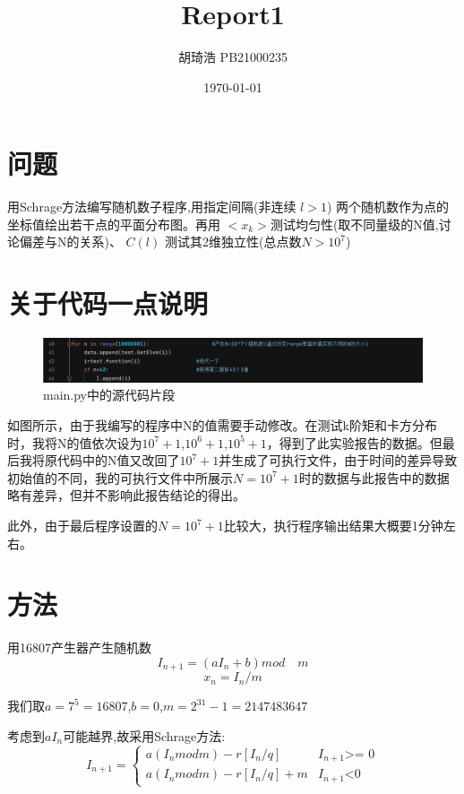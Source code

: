 \documentclass[UTF8]{ctexart}
\title{\textbf{Report1}}
\author{胡琦浩  PB21000235}
\date{\today}
\begin{document}
\maketitle

\section{问题}
用Schrage方法编写随机数子程序,用指定间隔(非连续 $l >1$)
两个随机数作为点的坐标值绘出若干点的平面分布图。再用
$<x_k>$测试均匀性(取不同量级的N值,讨论偏差与N的关系)、
$C(l)$ 测试其2维独立性(总点数$N > 10^7$)

\section{关于代码一点说明}
\begin{figure}[htbp]
    \centering
    \includegraphics[scale=0.5]{2}
    \caption{main.py中的源代码片段}
\end{figure}
如图所示，由于我编写的程序中N的值需要手动修改。在测试k阶矩和卡方分布时，我将N的值依次设为$10^7+1$,$10^6+1$,$10^5+1$，得到了此实验报告的数据。但最后我将原代码中的N值又改回了$10^7+1$并生成了可执行文件，由于时间的差异导致初始值的不同，我的可执行文件中所展示$N=10^7+1$时的数据与此报告中的数据略有差异，但并不影响此报告结论的得出。

此外，由于最后程序设置的$N=10^7+1$比较大，执行程序输出结果大概要1分钟左右。

\section{方法}
用16807产生器产生随机数
\begin{equation}
    I_{n+1}=(aI_n+b)mod \quad m
\end{equation}
\begin{equation}
    x_n=I_n/m
\end{equation}

我们取$a=7^5=16807$,\quad $b=0$,\quad$m=2^{31}-1=2147483647$

考虑到$aI_n$可能越界,故采用Schrage方法:
\[
    I_{n+1} =
\begin{cases}
    a(I_nmod m)-r[I_n/q]  & I_{n+1}\mbox{>= 0} \\
    a(I_n mod  m)-r[I_n/q]+m & I_{n+1}\mbox{<0}
\end{cases}
\]
\end{document}
